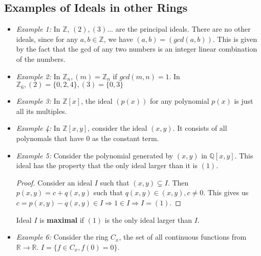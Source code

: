 \subsection{Examples of Ideals in other Rings}
\begin{itemize}
  \item \emph{Example 1:} In $\mathbb{Z}$, $(2), (3) ... $ are the principal ideals.
    There are no other ideals, since for any $a, b \in \mathbb{Z}$, we have $(a, b) = (gcd(a, b))$.
    This is given by the fact that the gcd of any two numbers is an integer linear combination of the numbers.
  \item \emph{Example 2:} In $\mathbb{Z}_{n}, (m) = \mathbb{Z}_{n}$ if $gcd(m, n) = 1$.
    In $\mathbb{Z}_{6}, (2) = \{ 0, 2, 4 \}, (3) = \{0, 3 \} $
  \item \emph{Example 3:} In $\mathbb{Z}[x]$, the ideal $(p(x))$ for any polynomial $p(x)$ is just all its multiples.
  \item \emph{Example 4:} In $\mathbb{Z}[x, y]$, consider the ideal $(x, y).$
    It consists of all polynomals that have $0$ as the constant term.
  \item \emph{Example 5:} Consider the polynomial generated by $(x, y)$ in $\mathbb{Q}[x, y]$.
    This ideal has the property that the only ideal larger than it is $(1)$.
    \begin{proof} \label{pf:maxideals}
      Consider an ideal $I$ such that $(x, y) \subsetneq I.$
      Then $p(x, y) = c + q(x, y)$ such that $q(x, y) \in (x, y), c \neq 0$.
      This gives us $c = p(x, y) - q(x, y) \in I \Rightarrow 1 \in I \Rightarrow I = (1)$.
    \end{proof}
    \begin{definition}
      Ideal $I$ is \textbf{maximal} if $(1)$ is the only ideal larger than $I$.
    \end{definition}
  \item \emph{Example 6:} Consider the ring $C_{x}$, the set of all continuous functions from $\mathbb{R} \rightarrow \mathbb{R}$.
    $I = \{ f \in C_{x}, f(0) = 0 \}$.
\end{itemize}

